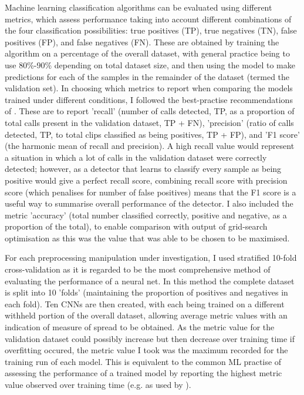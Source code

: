 \documentclass[11pt]{article}
\begin{document}
Machine learning classification algorithms can be evaluated using different metrics, which assess performance taking into account different combinations of the four classification possibilities: true positives (TP), true negatives (TN), false positives (FP), and false negatives (FN). These are obtained by training the algorithm on a percentage of the overall dataset, with general practice being to use 80\%-90\% depending on total dataset size, and then using the model to make predictions for each of the samples in the remainder of the dataset (termed the validation set). In choosing which metrics to report when comparing the models trained under  different conditions, I followed the best-practise recommendations of \cite{knight2017recommendations}. These are to report 'recall' (number of calls detected, TP, as a proportion of total calls present in the validation dataset, TP + FN), 'precision' (ratio of calls detected, TP, to total clips classified as being positives, TP + FP), and 'F1 score' (the harmonic mean of recall and precision). A high recall value would represent a situation in which a lot of calls in the validation dataset were correctly detected; however, as a detector that learns to classify every sample as being positive would give a perfect recall score, combining recall score with precision score (which penalises for number of false positives) means that the F1 score is a useful way to summarise overall performance of the detector. I also included the metric 'accuracy' (total number classified correctly, positive and negative, as a proportion of the total), to enable comparison with output of grid-search optimisation as this was the value that was able to be chosen to be maximised. 

For each preprocessing manipulation under investigation, I used stratified 10-fold cross-validation as it is regarded to be the most comprehensive method of evaluating the performance of a neural net. In this method the complete dataset is split into 10 'folds' (maintaining the proportion of positives and negatives in each fold). Ten CNNs are then created, with each being trained on a different withheld portion of the overall dataset, allowing average metric values with an indication of measure of spread to be obtained. As the metric value for the validation dataset could possibly increase but then decrease over training time if overfitting occured, the metric value I took was the maximum recorded for the training run of each model. This is equivalent to the common ML practise of assessing the performance of a trained model by reporting the highest metric value observed over training time (e.g. as used by \citep{norouzzadeh2018automatically}). 
\end{document}
